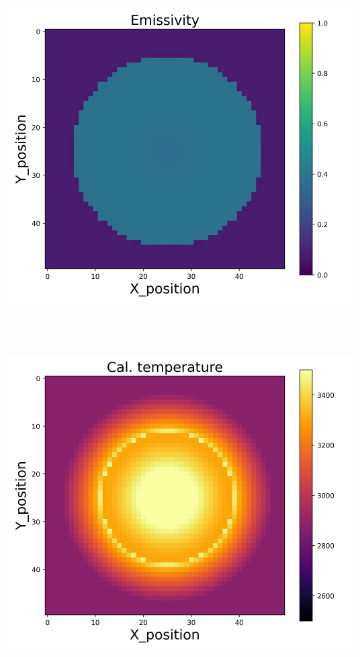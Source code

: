 \begin{figure}[htbp]
\begin{minipage}{\textwidth}
\begin{subfigure}{0.325\textwidth}
        \end{subfigure}
        \begin{subfigure}{0.325\textwidth}
            \centering
            \includegraphics[width=\textwidth]{figures/raw_data/21/T3500/linear/emi_cal.jpg}
        \end{subfigure}
    \end{minipage}\\
    \begin{minipage}{\textwidth}
        \centering
        \begin{subfigure}{0.325\textwidth}
            \centering
            \includegraphics[width=\textwidth]{figures/raw_data/5/T3500/linear/T_cal.jpg}

\end{subfigure}
\end{minipage}
\end{figure}
